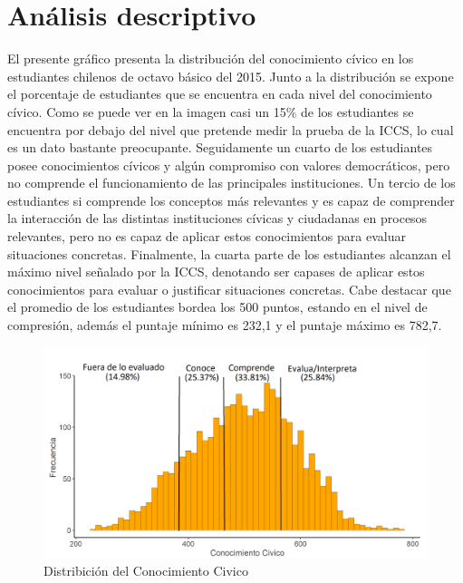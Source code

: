 \documentclass[12pt,twoside]{templates/facsothesis}
\begin{document}
\hypertarget{anuxe1lisis-descriptivo}{%
\section{Análisis descriptivo}\label{anuxe1lisis-descriptivo}}

El presente gráfico presenta la distribución del conocimiento cívico en los estudiantes chilenos de octavo básico del 2015. Junto a la distribución se expone el porcentaje de estudiantes que se encuentra en cada nivel del conocimiento cívico. Como se puede ver en la imagen casi un 15\% de los estudiantes se encuentra por debajo del nivel que pretende medir la prueba de la ICCS, lo cual es un dato bastante preocupante. Seguidamente un cuarto de los estudiantes posee conocimientos cívicos y algún compromiso con valores democráticos, pero no comprende el funcionamiento de las principales instituciones. Un tercio de los estudiantes si comprende los conceptos más relevantes y es capaz de comprender la interacción de las distintas instituciones cívicas y ciudadanas en procesos relevantes, pero no es capaz de aplicar estos conocimientos para evaluar situaciones concretas. Finalmente, la cuarta parte de los estudiantes alcanzan el máximo nivel señalado por la ICCS, denotando ser capases de aplicar estos conocimientos para evaluar o justificar situaciones concretas. Cabe destacar que el promedio de los estudiantes bordea los 500 puntos, estando en el nivel de compresión, además el puntaje mínimo es 232,1 y el puntaje máximo es 782,7.

\begin{figure}

{\centering \includegraphics[width=0.9\linewidth]{images/dist} 

}

\caption{Distribición del Conocimiento Civico}\label{fig:unnamed-chunk-6}
\end{figure}
\end{document}
